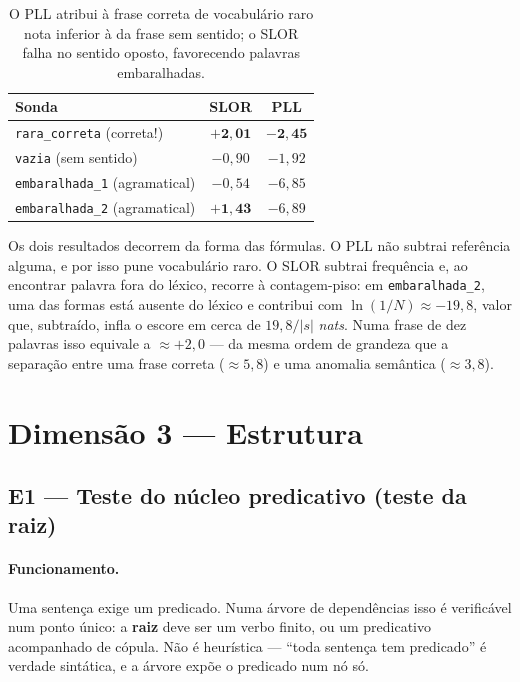 \documentclass[11pt,a4paper]{article}
\newcommand{\dimtable}[1]{\small #1}
\begin{document}
\begin{table}[H]
\centering
\dimtable{
\begin{tabular}{@{}lcc@{}}
\toprule
\textbf{Sonda} & \textbf{SLOR} & \textbf{PLL} \\
\midrule
\texttt{rara\_correta} (correta!) & $\mathbf{+2{,}01}$ & $\mathbf{-2{,}45}$ \\
\texttt{vazia} (sem sentido)      & $-0{,}90$ & $-1{,}92$ \\
\texttt{embaralhada\_1} (agramatical) & $-0{,}54$ & $-6{,}85$ \\
\texttt{embaralhada\_2} (agramatical) & $\mathbf{+1{,}43}$ & $-6{,}89$ \\
\bottomrule
\end{tabular}}
\caption{O PLL atribui à frase correta de vocabulário raro nota inferior à da frase sem sentido; o
SLOR falha no sentido oposto, favorecendo palavras embaralhadas.}
\label{tab:sondas-gram}
\end{table}

\noindent Os dois resultados decorrem da forma das fórmulas. O PLL não subtrai referência alguma, e
por isso pune vocabulário raro. O SLOR subtrai frequência e, ao encontrar palavra fora do léxico,
recorre à contagem-piso: em \texttt{embaralhada\_2}, uma das formas está ausente do léxico
e contribui com $\ln(1/N) \approx -19{,}8$, valor que, subtraído, infla o escore em cerca de
$19{,}8/|s|$ \textit{nats}. Numa frase de dez palavras isso equivale a $\approx +2{,}0$ --- da mesma
ordem de grandeza que a separação entre uma frase correta ($\approx 5{,}8$) e uma anomalia semântica
($\approx 3{,}8$).

\section{Dimensão 3 --- Estrutura}

\subsection{E1 --- Teste do núcleo predicativo (teste da raiz)}

\paragraph{Funcionamento.} Uma sentença exige um predicado. Numa árvore de dependências isso é
verificável num ponto único: a \textbf{raiz} deve ser um verbo finito, ou um predicativo acompanhado
de cópula. Não é heurística --- ``toda sentença tem predicado'' é verdade sintática, e a árvore
expõe o predicado num nó só.
\end{document}
